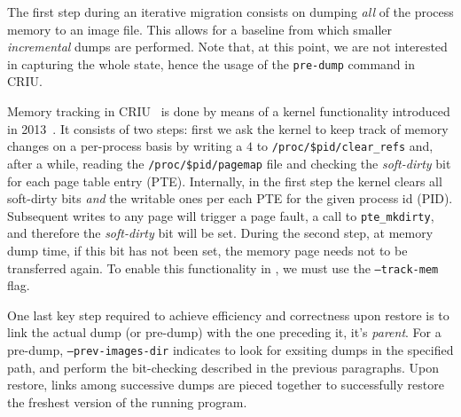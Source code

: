 The first step during an iterative migration consists on dumping \emph{all} of the process memory to an image file.
This allows for a baseline from which smaller \emph{incremental} dumps are performed.
Note that, at this point, we are not interested in capturing the whole state, hence the usage of the \texttt{pre-dump} command in CRIU.

Memory tracking in CRIU~\cite{criu-memory-tracking} is done by means of a kernel functionality introduced in 2013~\cite{criu-memory-tracking-lwn}.
It consists of two steps: first we ask the kernel to keep track of memory changes on a per-process basis by writing a $4$ to \texttt{/proc/\$pid/clear\_refs} and, after a while, reading the \texttt{/proc/\$pid/pagemap} file and checking the \textit{soft-dirty} bit for each page table entry (PTE).
Internally, in the first step the kernel clears all soft-dirty bits \emph{and} the writable ones per each PTE for the given process id (PID).
Subsequent writes to any page will trigger a page fault, a call to \texttt{pte\_mkdirty}, and therefore the \textit{soft-dirty} bit will be set.
During the second step, at memory dump time, if this bit has not been set, the memory page needs not to be transferred again.
To enable this functionality in \criu, we must use the \texttt{--track-mem} flag.

One last key step required to achieve efficiency and correctness upon restore is to link the actual dump (or pre-dump) with the one preceding it, it's \emph{parent}.
For a pre-dump, \texttt{--prev-images-dir} indicates \criu to look for exsiting dumps in the specified path, and perform the bit-checking described in the previous paragraphs.
Upon restore, links among successive dumps are pieced together to successfully restore the freshest version of the running program.

